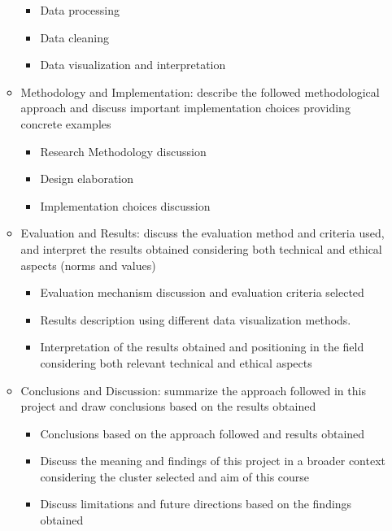 \documentclass[]{article}
\begin{document}
\begin{itemize}
\begin{itemize}
\begin{itemize}
            \item Data processing
            \item Data cleaning
            \item Data visualization and interpretation
        \end{itemize}
        \item Methodology and Implementation: describe the followed methodological approach and discuss important implementation choices providing concrete examples
        \begin{itemize}
            \item Research Methodology discussion
            \item Design elaboration
            \item Implementation choices discussion
        \end{itemize}
        \item Evaluation and Results: discuss the evaluation method and criteria used, and interpret the results obtained considering both technical and ethical aspects (norms and values)
        \begin{itemize}
            \item Evaluation mechanism discussion and evaluation criteria selected
            \item Results description using different data visualization methods.
            \item Interpretation of the results obtained and positioning in the field considering both relevant technical and ethical aspects
        \end{itemize}
        \item Conclusions and Discussion: summarize the approach followed in this project and draw conclusions based on the results obtained
        \begin{itemize}
            \item Conclusions based on the approach followed and results obtained
            \item Discuss the meaning and findings of this project in a broader context considering the cluster selected and aim of this course
            \item Discuss limitations and future directions based on the findings obtained
        \end{itemize}
    \end{itemize}
\end{itemize}

\printbibliography
\end{document}

